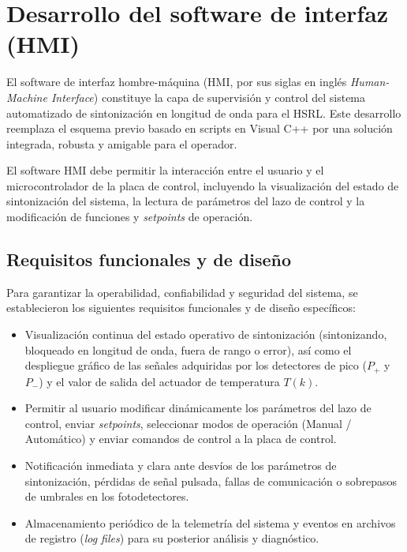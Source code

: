 \chapter{Desarrollo del software de interfaz (HMI)}
\label{cap:software_hmi}

El software de interfaz hombre-máquina (HMI, por sus siglas en inglés \emph{Human-Machine Interface}) constituye la capa de supervisión y control del sistema automatizado de sintonización en longitud de onda para el HSRL. Este desarrollo reemplaza el esquema previo basado en scripts en Visual C++ por una solución integrada, robusta y amigable para el operador.


El software HMI debe permitir la interacción entre el usuario y el microcontrolador de la placa de control, incluyendo la visualización del estado de sintonización del sistema, la lectura de parámetros del lazo de control y la modificación de funciones y \emph{setpoints} de operación.

\section{Requisitos funcionales y de diseño}
\label{sec:reqhmi}

Para garantizar la operabilidad, confiabilidad y seguridad del sistema, se establecieron los siguientes requisitos funcionales y de diseño específicos:

\begin{itemize}
    \item Visualización continua del estado operativo de sintonización (sintonizando, bloqueado en longitud de onda, fuera de rango o error), así como el despliegue gráfico de las señales adquiridas por los detectores de pico ($P_+$ y $P_-$) y el valor de salida del actuador de temperatura $T(k)$.
    \item Permitir al usuario modificar dinámicamente los parámetros del lazo de control, enviar \emph{setpoints}, seleccionar modos de operación (Manual / Automático) y enviar comandos de control a la placa de control.
    \item Notificación inmediata y clara ante desvíos de los parámetros de sintonización, pérdidas de señal pulsada, fallas de comunicación o sobrepasos de umbrales en los fotodetectores.
    \item Almacenamiento periódico de la telemetría del sistema y eventos en archivos de registro (\emph{log files}) para su posterior análisis y diagnóstico.
\end{itemize}

